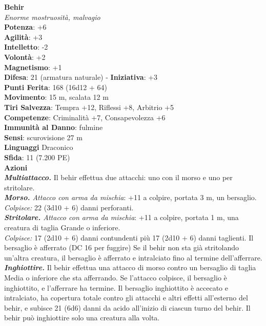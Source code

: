 \begin{multicols}{2}
\medskip\textbf{Behir}\\
\emph{Enorme mostruosità, malvagio}\\
\textbf{Potenza}: +6\\
\textbf{Agilità}: +3\\
\textbf{Intelletto}: -2\\
\textbf{Volontà}: +2\\
\textbf{Magnetismo}: +1\\
\textbf{Difesa}: 21 (armatura naturale) - \textbf{Iniziativa}: +3\\
\textbf{Punti Ferita}: 168 (16d12 + 64)\\
\textbf{Movimento}: 15 m, scalata 12 m\\
\textbf{Tiri Salvezza}: Tempra +12, Riflessi +8, Arbitrio +5\\
\textbf{Competenze}: Criminalità +7, Consapevolezza +6\\
\textbf{Immunità al Danno}: fulmine\\
\textbf{Sensi}: scurovisione 27 m\\
\textbf{Linguaggi} Draconico\\
\textbf{Sfida}: 11 (7.200 PE)\smallskip\\
\smallskip\textbf{Azioni}\\
\emph{\textbf{Multiattacco.}} Il behir effettua due attacchi: uno con il morso e uno per stritolare.\\
\emph{\textbf{Morso.} Attacco con arma da mischia}: +11 a colpire, portata 3 m, un bersaglio.\\
\emph{Colpisce:} 22 (3d10 + 6) danni perforanti.\\
\emph{\textbf{Stritolare.} Attacco con arma da mischia}: +11 a colpire, portata 1 m, una creatura di taglia Grande o inferiore.\\
\emph{Colpisce:} 17 (2d10 + 6) danni contundenti più 17 (2d10 + 6) danni taglienti. Il bersaglio è afferrato (DC 16 per fuggire) Se il behir non sta già stritolando un'altra creatura, il bersaglio è afferrato e intralciato fino al termine dell'afferrare.\\
\emph{\textbf{Inghiottire.}} Il behir effettua una attacco di morso contro un bersaglio di taglia Media o inferiore che sta afferrando. Se l'attacco colpisce, il bersaglio è inghiottito, e l'afferrare ha termine. Il bersaglio inghiottito è accecato e intralciato, ha copertura totale contro gli attacchi e altri effetti all'esterno del behir, e subisce 21 (6d6) danni da acido all'inizio di ciascun turno del behir. Il behir può inghiottire solo una creatura alla volta.\\

\end{multicols}
